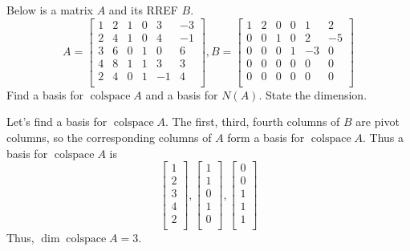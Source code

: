 \documentclass{article}
\DeclareMathOperator{\colspace}{colspace}
\begin{document}
  \begin{example}
    Below is a matrix $A$ and its RREF $B$.
    \[
      A =
      \begin{bmatrix}
        1 & 2 & 1 & 0 & 3 & -3\\
        2 & 4 & 1 & 0 & 4 & -1\\
        3 & 6 & 0 & 1 & 0 & 6\\
        4 & 8 & 1 & 1 & 3 & 3\\
        2 & 4 & 0 & 1 & -1 & 4\\
      \end{bmatrix}, B=
      \begin{bmatrix}
        1 & 2 & 0 & 0 & 1 & 2\\
        0 & 0 & 1 & 0 & 2 & -5\\
        0 & 0 & 0 & 1 & -3 & 0\\
        0 & 0 & 0 & 0 & 0 & 0\\
        0 & 0 & 0 & 0 & 0 & 0\\
      \end{bmatrix}
    \]
    Find a basis for $\colspace A$ and a basis for $N(A)$. State the dimension.

    Let's find a basis for $\colspace A$. The first, third, fourth columns of $B$ are pivot columns, so the corresponding columns of $A$ form a basis for $\colspace A$. Thus a basis for $\colspace A$ is
    \[
      \begin{bmatrix}
        1\\2\\3\\4\\2\\
      \end{bmatrix},
      \begin{bmatrix}
        1\\1\\0\\1\\0\\
      \end{bmatrix},
      \begin{bmatrix}
        0\\0\\1\\1\\1\\
      \end{bmatrix}
    \]
    Thus, $\dim \colspace A = 3$.


\end{example}
\end{document}
